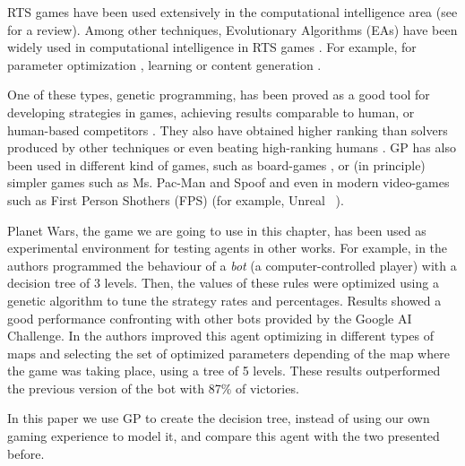 


RTS games have been used extensively in the computational intelligence area (see \cite{Lara2013review} for a review).
Among other techniques, Evolutionary Algorithms (EAs) have been widely used in computational intelligence in RTS games \cite{Lara2013review}. For example, for parameter optimization \cite{Esparcia10FPS}, learning \cite{Kenneth2005neuroevolution} or content generation \cite{Mahlmann2012MapGeneration}. 

One of these types, genetic programming, has been proved as a good tool for developing strategies in games, achieving results comparable to human, or human-based competitors \cite{Sipper2007gameplaying}. They also have obtained higher ranking than solvers produced by other techniques or even beating high-ranking humans \cite{Elyasaf2012FreeCell}. GP has also been used in different kind of games, such as board-games \cite{Benbassat2012Reversi}, or (in principle) simpler games such as Ms. Pac-Man \cite{Brandstetter2012PacMan} and Spoof \cite{Wittkamp2007spoof} and even in modern video-games such as First Person Shothers (FPS) (for example, Unreal\texttrademark~ \cite{Esparcia2013GPunreal}).


Planet Wars, the game we are going to use in this chapter, has been used as experimental environment for testing agents in other works. For example, in
\cite{Mora2012Genebot} the authors programmed the behaviour of a {\em bot} (a computer-controlled player) with a decision tree of 3 levels. Then, the values of these rules were optimized using a genetic algorithm to tune the strategy rates and percentages.  %
  Results showed a good performance confronting with other bots
  provided by the Google AI Challenge. 
  In \cite{FernandezAres2012adaptive} the authors improved this agent optimizing
  in different types of maps and selecting the set of optimized
  parameters depending of the map where the game was taking place,
  using a tree of 5 levels. These results outperformed the previous
  version of the bot with 87\% of victories. 

In this paper we use GP to create the decision tree,
instead of using our own gaming experience to model it, and compare
this agent with the two presented before.  


